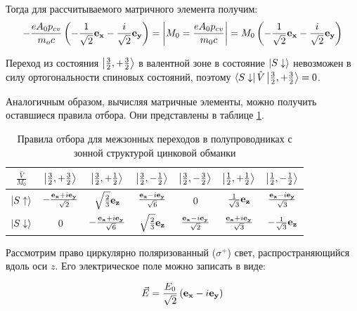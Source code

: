 \documentclass[14pt]{extarticle}
\numberwithin{equation}{section}
\begin{document}
Тогда для рассчитываемого матричного элемента получим:
\[ - \frac{eA_0p_{cv}}{m_oc} \left( - \frac{1}{\sqrt{2}}{\bf {\bf e_x}} - \frac{i}{\sqrt{2}}{\bf {\bf e_y}} \right) = \bigg| M_0 = \frac{e A_0 p_{cv}}{m_0c }  \bigg| = M_0 \left( - \frac{1}{\sqrt{2}}{\bf {\bf e_x}} - \frac{i}{\sqrt{2}}{\bf {\bf e_y}} \right)\]

Переход из состояния $\ket{\frac{3}{2}, +\frac{3}{2}}$ в валентной зоне в состояние $\ket{S \downarrow}$ невозможен в силу ортогональности спиновых состояний, поэтому $\bra{S\downarrow}\hat{V}\ket{\frac{3}{2}, +\frac{3}{2}} = 0$.

Аналогичным образом, вычисляя матричные элементы, можно получить оставшиеся правила отбора. Они представлены в таблице \ref{tab:selection_rules}.   

\begin{table}[h]
\centering

 \caption{Правила отбора для межзонных переходов в  полупроводниках с зонной структурой цинковой обманки}   


\renewcommand{\arraystretch}{1.5}
\large
\begin{tabular}{|c|c|c|c|c|c|c|}
\hline
$\frac{\hat{V}}{M_0}$ & $\ket{\frac{3}{2}, +\frac{3}{2}}$          & $\ket{\frac{3}{2}, +\frac{1}{2}}$          & $\ket{\frac{3}{2}, -\frac{1}{2}}$        & $\ket{\frac{3}{2}, -\frac{3}{2}}$          & $\ket{\frac{1}{2}, +\frac{1}{2}}$         & $\ket{\frac{1}{2}, -\frac{1}{2}}$          \\ \hline
$\ket{S\uparrow}$           & $-\frac{{\bf e_x} + i{\bf e_y}}{\sqrt{2}}$ & $\sqrt{\frac{2}{3}}{\bf e_z}$              & $\frac{{\bf e_x} - i{\bf e_y}}{\sqrt{6}}$ & $0$                                        & $\frac{1}{\sqrt{3}}{\bf e_z}$             & $\frac{{\bf e_x} - i {\bf e_y}}{\sqrt{3}}$ \\ \hline
$\ket{S\downarrow}$         & $0$                                        & $-\frac{{\bf e_x} + i{\bf e_y}}{\sqrt{6}}$ & $\sqrt{\frac{2}{3}}{\bf e_z}$            & $\frac{{\bf e_x} - i {\bf e_y}}{\sqrt{2}}$ & $\frac{{\bf e_x} + i{\bf e_y}}{\sqrt{3}}$ & $-\frac{1}{\sqrt{3}}{\bf e_z}$             \\ \hline
\end{tabular}
\label{tab:selection_rules}
\end{table}

 Рассмотрим право циркулярно поляризованный ($\sigma^+$) свет, распространяющийся вдоль оси $z$. Его электрическое поле можно записать в виде:

\begin{equation}
\vec{E} = \frac{E_0}{\sqrt{2}}\left({\bf e_x} - i{\bf e_y} \right)
\end{equation}
\end{document}
